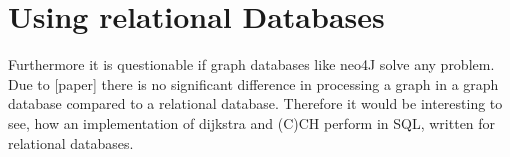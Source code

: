 \section{Using relational Databases}

Furthermore it is questionable if graph databases like neo4J solve any problem. Due to [paper] there is no significant difference in processing a graph in a graph database compared to a relational 
database. Therefore it would be interesting to see, how an implementation of dijkstra and (C)CH perform in SQL, written for relational databases. 